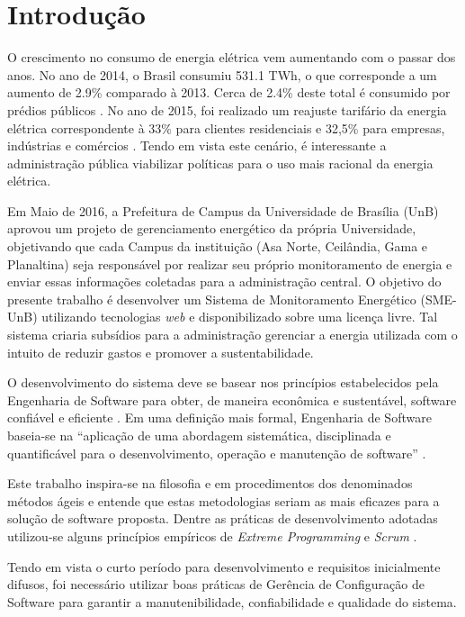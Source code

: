 \chapter{Introdução}
O crescimento no consumo de energia elétrica vem aumentando com o passar dos anos. No
ano de 2014, o Brasil consumiu 531.1 TWh, o que corresponde a um aumento de 2.9\% comparado à 2013. Cerca de 2.4\% deste total é consumido por prédios públicos \cite{balanco_energetico}. No ano de 2015, foi realizado um reajuste tarifário da energia elétrica correspondente à 33\% para clientes residenciais e 32,5\% para empresas, indústrias e comércios \cite{aumento_energia}. Tendo em vista este cenário, é interessante a administração pública viabilizar políticas para o uso mais racional da energia elétrica.

Em Maio de 2016, a Prefeitura de Campus da Universidade de Brasília (UnB) aprovou um projeto de gerenciamento energético da própria Universidade, objetivando que cada Campus da instituição (Asa Norte, Ceilândia, Gama e Planaltina) seja responsável por realizar seu próprio monitoramento de energia e enviar essas informações coletadas para a administração central. O objetivo do presente trabalho é desenvolver um Sistema de Monitoramento Energético (SME-UnB) utilizando tecnologias \textit{web} e disponibilizado sobre uma licença livre. Tal sistema criaria subsídios para a administração gerenciar a energia utilizada com o intuito de reduzir gastos e promover a sustentabilidade.

O desenvolvimento do sistema deve se basear nos princípios estabelecidos pela Engenharia de Software para obter, de maneira econômica e sustentável, software confiável e eficiente \cite{naur_1969}. Em uma definição mais formal, Engenharia de Software baseia-se na ``aplicação de uma abordagem sistemática, disciplinada e quantificável para o desenvolvimento, operação e manutenção de software'' \cite{ieee_glossary}.

Este trabalho inspira-se na filosofia e em procedimentos dos denominados métodos ágeis \cite{beck2001agile} e entende que estas metodologias seriam as mais eficazes para a solução de software proposta. Dentre as práticas de desenvolvimento adotadas utilizou-se alguns princípios empíricos de \textit{Extreme Programming} \cite{beck_2004} e \textit{Scrum} \cite{scrum_guide}.

Tendo em vista o curto período para desenvolvimento e requisitos inicialmente difusos, foi necessário utilizar boas práticas de Gerência de Configuração de Software \cite{SWEBOK2014} para garantir a manutenibilidade, confiabilidade e qualidade do sistema.

